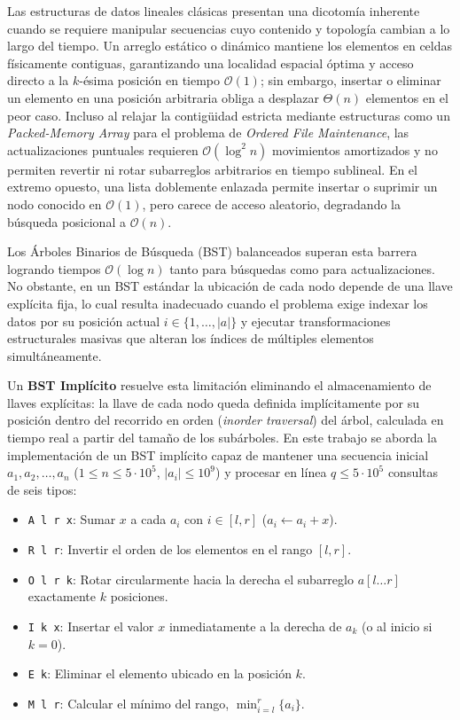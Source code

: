\documentclass[journal,10pt,a4paper]{IEEEtran}
\begin{document}
Las estructuras de datos lineales clásicas presentan una dicotomía inherente cuando se requiere manipular secuencias cuyo contenido y topología cambian a lo largo del tiempo. Un arreglo estático o dinámico mantiene los elementos en celdas físicamente contiguas, garantizando una localidad espacial óptima y acceso directo a la $k$-ésima posición en tiempo $\mathcal{O}(1)$; sin embargo, insertar o eliminar un elemento en una posición arbitraria obliga a desplazar $\Theta(n)$ elementos en el peor caso. Incluso al relajar la contigüidad estricta mediante estructuras como un \textit{Packed-Memory Array} para el problema de \textit{Ordered File Maintenance}, las actualizaciones puntuales requieren $\mathcal{O}(\log^2 n)$ movimientos amortizados y no permiten revertir ni rotar subarreglos arbitrarios en tiempo sublineal. En el extremo opuesto, una lista doblemente enlazada permite insertar o suprimir un nodo conocido en $\mathcal{O}(1)$, pero carece de acceso aleatorio, degradando la búsqueda posicional a $\mathcal{O}(n)$.

Los Árboles Binarios de Búsqueda (BST) balanceados superan esta barrera logrando tiempos $\mathcal{O}(\log n)$ tanto para búsquedas como para actualizaciones. No obstante, en un BST estándar la ubicación de cada nodo depende de una llave explícita fija, lo cual resulta inadecuado cuando el problema exige indexar los datos por su posición actual $i \in \{1, \dots, |a|\}$ y ejecutar transformaciones estructurales masivas que alteran los índices de múltiples elementos simultáneamente.

Un \textbf{BST Implícito} resuelve esta limitación eliminando el almacenamiento de llaves explícitas: la llave de cada nodo queda definida implícitamente por su posición dentro del recorrido en orden (\textit{inorder traversal}) del árbol, calculada en tiempo real a partir del tamaño de los subárboles. En este trabajo se aborda la implementación de un BST implícito capaz de mantener una secuencia inicial $a_1, a_2, \dots, a_n$ ($1 \le n \le 5 \cdot 10^5$, $|a_i| \le 10^9$) y procesar en línea $q \le 5 \cdot 10^5$ consultas de seis tipos:
\begin{itemize}
    \item \texttt{A l r x}: Sumar $x$ a cada $a_i$ con $i \in [l, r]$ ($a_i \leftarrow a_i + x$).
    \item \texttt{R l r}: Invertir el orden de los elementos en el rango $[l, r]$.
    \item \texttt{O l r k}: Rotar circularmente hacia la derecha el subarreglo $a[l \dots r]$ exactamente $k$ posiciones.
    \item \texttt{I k x}: Insertar el valor $x$ inmediatamente a la derecha de $a_k$ (o al inicio si $k = 0$).
    \item \texttt{E k}: Eliminar el elemento ubicado en la posición $k$.
    \item \texttt{M l r}: Calcular el mínimo del rango, $\min_{i=l}^r \{a_i\}$.
\end{itemize}
\end{document}
